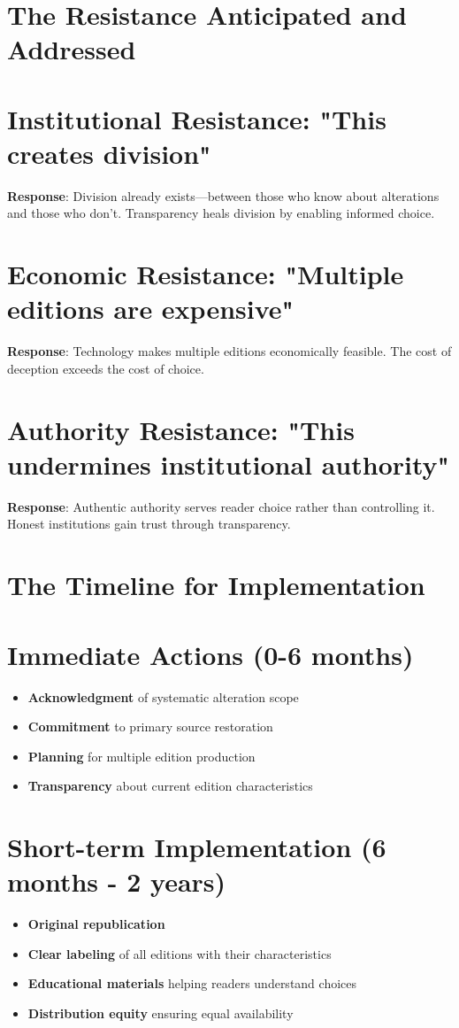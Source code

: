 \documentclass[11pt,twoside]{book}
\begin{document}
\section*{The Resistance Anticipated and Addressed}
\label{sec:orga253c42}

\section*{Institutional Resistance: "This creates division"}
\label{sec:org93ea6f7}
\textbf{\textbf{Response}}: Division already exists—between those who know about alterations and those who don't. Transparency heals division by enabling informed choice.
\section*{Economic Resistance: "Multiple editions are expensive"}
\label{sec:org0346562}
\textbf{\textbf{Response}}: Technology makes multiple editions economically feasible. The cost of deception exceeds the cost of choice.
\section*{Authority Resistance: "This undermines institutional authority"}
\label{sec:orgc14a2ee}
\textbf{\textbf{Response}}: Authentic authority serves reader choice rather than controlling it. Honest institutions gain trust through transparency.
\section*{The Timeline for Implementation}
\label{sec:orgce4f25b}

\section*{Immediate Actions (0-6 months)}
\label{sec:org215e02b}
\begin{itemize}
\item \textbf{\textbf{Acknowledgment}} of systematic alteration scope
\item \textbf{\textbf{Commitment}} to primary source restoration
\item \textbf{\textbf{Planning}} for multiple edition production
\item \textbf{\textbf{Transparency}} about current edition characteristics
\end{itemize}
\section*{Short-term Implementation (6 months - 2 years)}
\label{sec:orgeaa914b}
\begin{itemize}
\item \textbf{\textbf{Original republication}}
\item \textbf{\textbf{Clear labeling}} of all editions with their characteristics
\item \textbf{\textbf{Educational materials}} helping readers understand choices
\item \textbf{\textbf{Distribution equity}} ensuring equal availability
\end{itemize}
\end{document}
